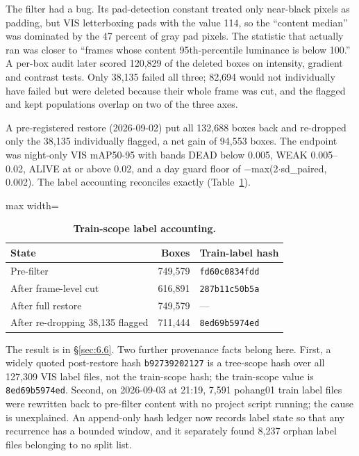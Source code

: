 \documentclass[10pt]{article}
\begin{document}
The filter had a bug. Its pad-detection constant treated only near-black pixels as padding, but VIS letterboxing pads with the value 114, so the ``content median'' was dominated by the 47 percent of gray pad pixels. The statistic that actually ran was closer to ``frames whose content 95th-percentile luminance is below 100.'' A per-box audit later scored 120,829 of the deleted boxes on intensity, gradient and contrast tests. Only 38,135 failed all three; 82,694 would not individually have failed but were deleted because their whole frame was cut, and the flagged and kept populations overlap on two of the three axes.

A pre-registered restore (2026-09-02) put all 132,688 boxes back and re-dropped only the 38,135 individually flagged, a net gain of 94,553 boxes. The endpoint was night-only VIS mAP50-95 with bands DEAD below 0.005, WEAK 0.005--0.02, ALIVE at or above 0.02, and a day guard floor of $-$max(2$\cdot$sd\_paired, 0.002). The label accounting reconciles exactly (Table~\ref{tab:D}).

\begin{table}[htbp]
\centering
\small
\caption{\textbf{Train-scope label accounting.}}
\label{tab:D}
\begin{adjustbox}{max width=\linewidth}
\begin{tabular}{lrl}
\toprule
State & Boxes & Train-label hash \\
\midrule
Pre-filter & 749,579 & \texttt{fd60c0834fdd} \\
After frame-level cut & 616,891 & \texttt{287b11c50b5a} \\
After full restore & 749,579 & --- \\
After re-dropping 38,135 flagged & 711,444 & \texttt{8ed69b5974ed} \\
\bottomrule
\end{tabular}
\end{adjustbox}
\end{table}
The result is in \S\ref{sec:6.6}. Two further provenance facts belong here. First, a widely quoted post-restore hash \texttt{b92739202127} is a tree-scope hash over all 127,309 VIS label files, not the train-scope hash; the train-scope value is \texttt{8ed69b5974ed}. Second, on 2026-09-03 at 21:19, 7,591 pohang01 train label files were rewritten back to pre-filter content with no project script running; the cause is unexplained. An append-only hash ledger now records label state so that any recurrence has a bounded window, and it separately found 8,237 orphan label files belonging to no split list.
\end{document}

